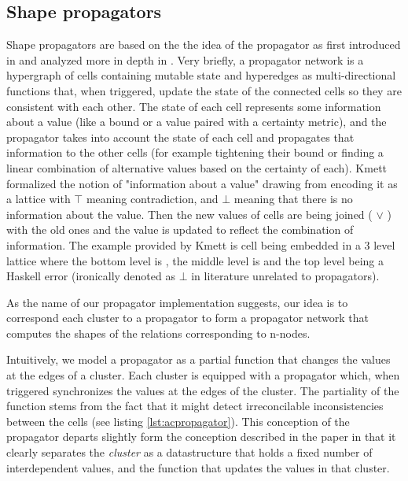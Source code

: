 \subsection{Shape propagators}
\label{sec:shape_propagators}

Shape propagators are based on the the idea of the propagator as first
introduced in \cite{sussmanArtPropagator2009} and analyzed more in depth in
\cite{hansonSoftwareDesignFlexibility2021a}. Very briefly, a propagator
network is a hypergraph of cells containing mutable state and
hyperedges as multi-directional functions that, when triggered, update
the state of the connected cells so they are consistent with each
other. The state of each cell represents some information about a
value (like a bound or a value paired with a certainty metric), and
the propagator takes into account the state of each cell and
propagates that information to the other cells (for example tightening
their bound or finding a linear combination of alternative values
based on the certainty of each). Kmett \cite{kmettPropagators2021}
formalized the notion of "information about a value" drawing from
\cite{kuperLVarsLatticebasedData2013} encoding it as a lattice with
\(\top\) meaning contradiction, and \(\bot\) meaning that there is no
information about the value. Then the new values of cells are being
joined ( \(\lor\) ) with the old ones and the value is updated to
reflect the combination of information. The example provided by Kmett
is cell being embedded in a 3 level lattice where the bottom level is
, the middle level is  and the top level
being a Haskell error (ironically denoted as \(\bot\) in literature 
unrelated to propagators).

As the name of our propagator implementation suggests, our idea is to
correspond each cluster to a propagator to form a propagator network
that computes the shapes of the relations corresponding to n-nodes.

Intuitively, we model a propagator as a partial function that changes
the values at the edges of a cluster. Each cluster 
is equipped with a propagator which, when
triggered synchronizes the values at the edges of the cluster. The
partiality of the function stems from the fact that it might detect
irreconcilable inconsistencies between the cells (see listing
\ref{lst:acpropagator}). This conception of the propagator departs slightly
form the conception described in the paper in that it clearly
separates the \emph{cluster} as a datastructure that holds a fixed
number of interdependent values, and the function that updates the
values in that cluster.


